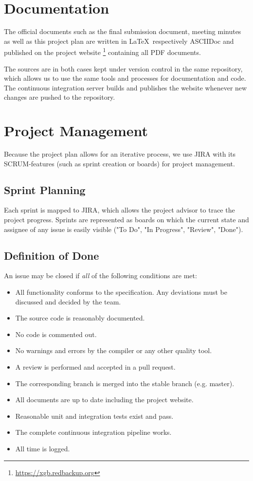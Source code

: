 \section{Documentation}
The official documents such as the final submission document, meeting minutes as well as this project plan are written in \LaTeX~respectively ASCIIDoc and published on the project website \footnote{\url{https://xgb.redbackup.org}} containing all PDF documents.

The sources are in both cases kept under version control in the same repository, which allows us to use the same tools and processes for documentation and code. The continuous integration server builds and publishes the website whenever new changes are pushed to the repository.

\section{Project Management}
Because the project plan allows for an iterative process, we use JIRA with its SCRUM-features (such as sprint creation or boards) for project management.

\subsection{Sprint Planning}
Each sprint is mapped to JIRA, which allows the project advisor to trace the project progress. Sprints are represented as boards on which the current state and assignee of any issue is easily visible ("To Do", "In Progress", "Review", "Done").


\subsection{Definition of Done}
An issue may be closed if \emph{all} of the following conditions are met:

\begin{itemize}
    \item All functionality conforms to the specification. Any deviations must be discussed and decided by the team.
    \item The source code is reasonably documented.
    \item No code is commented out.
    \item No warnings and errors by the compiler or any other quality tool.
    \item A review is performed and accepted in a pull request.
    \item The corresponding branch is merged into the stable branch (e.g. master).
    \item All documents are up to date including the project website.
    \item Reasonable unit and integration tests exist and pass.
    \item The complete continuous integration pipeline works.
    \item All time is logged.
\end{itemize}

